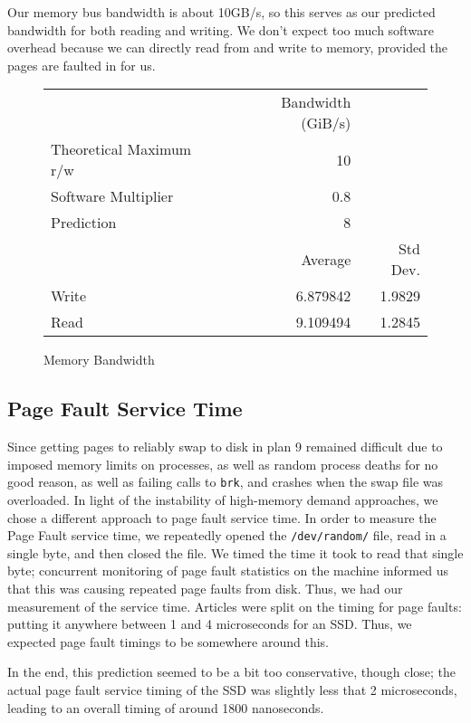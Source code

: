 \documentclass[letterpaper,twocolumn,10pt]{article}
\begin{document}
Our memory bus bandwidth is about 10GB/s, so this serves as our predicted
bandwidth for both reading and writing. We don't expect too much software
overhead because we can directly read from and write to memory, provided the
pages are faulted in for us.

\begin{figure}
	\centering
    \begin{tabular}{l r r}
      & Bandwidth (GiB/s)\\
      Theoretical Maximum r/w & 10\\
      Software Multiplier & 0.8 \\
      Prediction & 8\\
                   & Average & Std Dev.\\
      Write & 6.879842 & 1.9829 \\
      Read\protect\footnotemark & 9.109494  & 1.2845
\end{tabular}
\caption{Memory Bandwidth}
\label{tab:memorybandwidth}
\end{figure}
\subsection{Page Fault Service Time}
Since getting pages to reliably swap to disk in plan 9 remained difficult due to imposed memory limits on processes, as well as random process deaths for no good reason, as well as failing calls to \texttt{brk}, and crashes when the swap file was overloaded. In light of the instability of high-memory demand approaches, we chose a different approach to page fault service time. In order to measure the Page Fault service time, we repeatedly opened the \texttt{/dev/random/} file, read in a single byte, and then closed the file. We timed the time it took to read that single byte; concurrent monitoring of page fault statistics on the machine informed us that this was causing repeated page faults from disk. Thus, we had our measurement of the service time. Articles were split on the timing for page faults: putting it anywhere between 1 and 4 microseconds for an SSD. Thus, we expected page fault timings to be somewhere around this.

In the end, this prediction seemed to be a bit too conservative, though close; the actual page fault service timing of the SSD was slightly less that 2 microseconds, leading to an overall timing of around 1800 nanoseconds.
\end{document}
